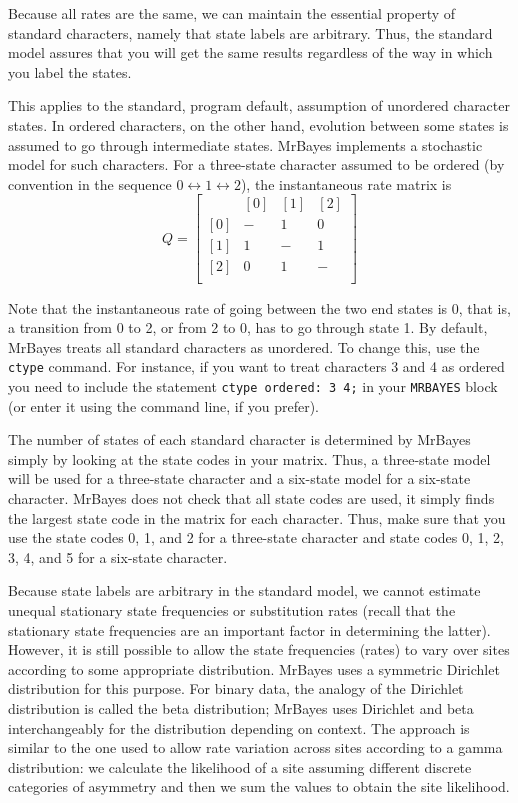 \documentclass[12pt]{book}
\begin{document}
Because all rates are the same, we can maintain the essential property of standard characters,
namely that state labels are arbitrary. Thus, the standard model assures that you will get the same
results regardless of the way in which you label the states.

This applies to the standard, program default, assumption of unordered character states. In ordered
characters, on the other hand, evolution between some states is assumed to go through intermediate
states. MrBayes implements a stochastic model for such characters. For a three-state character
assumed to be ordered (by convention in the sequence $0 \leftrightarrow 1 \leftrightarrow 2$), the
instantaneous rate matrix is
\[
Q=\begin{bmatrix}
    & [0] & [1] & [2]\\
 [0]& - & 1 & 0\\
 [1]& 1& -  & 1\\
 [2]& 0& 1  & -\\
\end{bmatrix}
\]

Note that the instantaneous rate of going between the two end states is 0, that is, a transition
from 0 to 2, or from 2 to 0, has to go through state 1. By default, MrBayes treats all standard
characters as unordered. To change this, use the \texttt{ctype} command. For instance, if you want
to treat characters 3 and 4 as ordered you need to include the statement \texttt{ctype ordered: 3
4;} in your \texttt{MRBAYES} block (or enter it using the command line, if you prefer).

The number of states of each standard character is determined by MrBayes simply by looking at the
state codes in your matrix. Thus, a three-state model will be used for a three-state character and
a six-state model for a six-state character. MrBayes does not check that all state codes are used,
it simply finds the largest state code in the matrix for each character. Thus, make sure that you
use the state codes 0, 1, and 2 for a three-state character and state codes 0, 1, 2, 3, 4, and 5
for a six-state character.

Because state labels are arbitrary in the standard model, we cannot estimate unequal stationary
state frequencies or substitution rates (recall that the stationary state frequencies are an
important factor in determining the latter). However, it is still possible to allow the state
frequencies (rates) to vary over sites according to some appropriate distribution. MrBayes uses a
symmetric Dirichlet distribution for this purpose. For binary data, the analogy of the Dirichlet
distribution is called the beta distribution; MrBayes uses Dirichlet and beta interchangeably for
the distribution depending on context. The approach is similar to the one used to allow rate
variation across sites according to a gamma distribution: we calculate the likelihood of a site
assuming different discrete categories of asymmetry and then we sum the values to obtain the site
likelihood.
\end{document}
